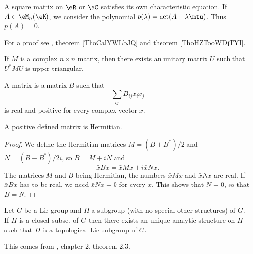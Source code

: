 \begin{theorem} \label{ThoCayleyHamilton}
    A square matrix on \( \eR\) or \( \eC\) satisfies its own characteristic equation. If \( A\in\eM_n(\eK)\), we consider the polynomial \( p(\lambda)=\det(A-\lambda\mtu)\). Thus \( p(A)=0\).
\end{theorem}
For a proof see , theorem \ref{ThoCalYWLbJQ} and theorem \ref{ThoHZTooWDjTYI}.

\begin{proposition}     \label{PropMtrDiagablaUnit}
    If \( M\) is a complex \( n\times n\) matrix, then there exists an unitary matrix \( U\) such that \( U^*MU\) is upper triangular.
\end{proposition}

\begin{definition}
    A  matrix is a matrix $B$ such that
    \begin{equation}
        \sum_{ij}B_{ij}\overline{ x_i }x_j
    \end{equation}
    is real and positive for every complex vector $x$.
\end{definition}

\begin{proposition}
    A positive defined matrix is Hermitian.
\end{proposition}

\begin{proof}
    We define the Hermitian matrices $M=(B+B^*)/2$ and $N=(B-B^*)/2i$, so $B=M+iN$ and
    \begin{equation}
        \bar x Bx=\bar x M x+i\bar x Nx.
    \end{equation}
    The matrices $M$ and $B$ being Hermitian, the numbers $\bar xMx$ and $\bar xNx$ are real. If $\bar xBx$ has to be real, we need $\bar xNx=0$ for every $x$. This shows that $N=0$, so that $B=N$.
\end{proof}

\begin{theorem}
Let $G$ be a Lie group and $H$ a subgroup (with no special other structures) of $G$. If $H$ is a closed subset of $G$ then there exists an unique analytic structure on $H$ such that $H$ is a topological Lie subgroup of $G$.
\label{Helgason2.3}
\end{theorem}
This comes from \cite{Helgason}, chapter 2, theorem 2.3.

